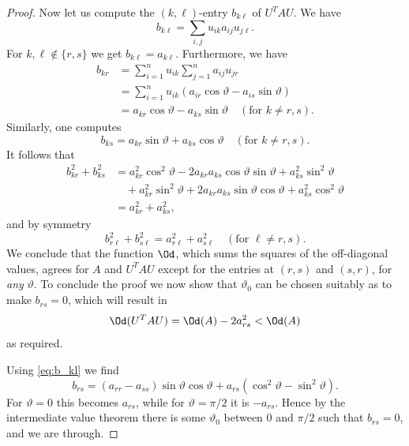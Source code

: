 \begin{proof}
  Now let us compute the $(k, \ell)$-entry $b_{k\ell}$ of $U^T A U$. We have
  \begin{equation} \label{eq:b_kl}
  b_{k\ell} = \sum_{i,j} u_{ik} a_{ij} u_{j\ell}.
  \end{equation}
  For $k, \ell \notin \{r, s\}$ we get $b_{k\ell} = a_{k\ell}$. Furthermore, we have
  \begin{align*}
  b_{kr} &= \sum_{i=1}^n u_{ik} \sum_{j=1}^n a_{ij} u_{jr} \\
  &= \sum_{i=1}^n u_{ik} (a_{ir} \cos \vartheta - a_{is} \sin \vartheta) \\
  &= a_{kr} \cos \vartheta - a_{ks} \sin \vartheta \quad (\text{for } k \ne r, s).
  \end{align*}
  Similarly, one computes
  \[
  b_{ks} = a_{kr} \sin \vartheta + a_{ks} \cos \vartheta \quad (\text{for } k \ne r, s).
  \]
  It follows that
  \begin{align*}
  b_{kr}^2 + b_{ks}^2 &= a_{kr}^2 \cos^2 \vartheta - 2 a_{kr} a_{ks} \cos \vartheta \sin \vartheta + a_{ks}^2 \sin^2 \vartheta \\
  &\quad + a_{kr}^2 \sin^2 \vartheta + 2 a_{kr} a_{ks} \sin \vartheta \cos \vartheta + a_{ks}^2 \cos^2 \vartheta \\
  &= a_{kr}^2 + a_{ks}^2,
  \end{align*}
  and by symmetry
  \[
  b_{r\ell}^2 + b_{s\ell}^2 = a_{r\ell}^2 + a_{s\ell}^2 \quad (\text{for } \ell \ne r, s).
  \]
  We conclude that the function $\Od$, which sums the squares of the off-diagonal values,
  agrees for $A$ and $U^T A U$ except for the entries at $(r, s)$ and $(s, r)$, for \emph{any} $\vartheta$.
  To conclude the proof we now show that $\vartheta_0$ can be chosen suitably as to make $b_{rs} = 0$, which will result in
  \[
  \Od(U^T A U) = \Od(A) - 2 a_{rs}^2 < \Od(A)
  \]
  as required.

  Using \eqref{eq:b_kl} we find
  \[
  b_{rs} = (a_{rr} - a_{ss}) \sin \vartheta \cos \vartheta + a_{rs} (\cos^2 \vartheta - \sin^2 \vartheta).
  \]
  For $\vartheta = 0$ this becomes $a_{rs}$, while for $\vartheta = \pi/2$ it is $-a_{rs}$.
  Hence by the intermediate value theorem there is some $\vartheta_0$ between $0$ and $\pi/2$ such that $b_{rs} = 0$,
  and we are through.
\end{proof}

